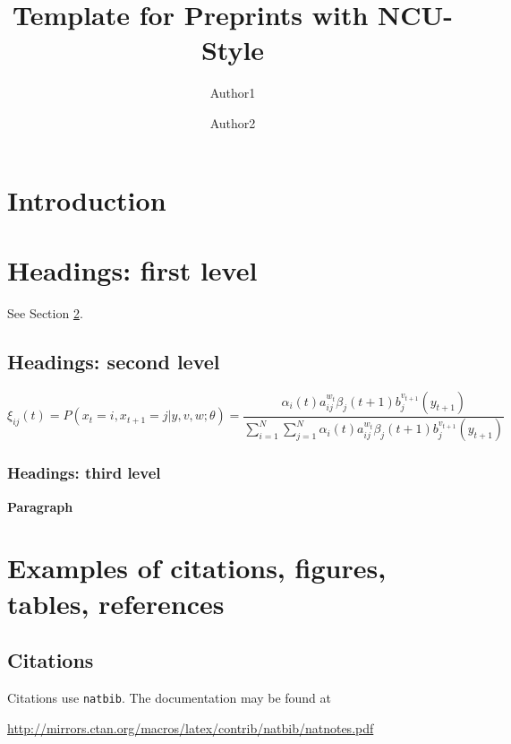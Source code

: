 \documentclass[]{ncu}
\title{Template for Preprints with NCU-Style}
\author[1]{Author1}
\author[2]{Author2}
\affiliation[1]{Affiliation}
\affiliation[2]{Affiliation}
\renewcommand{\paragraph}[1]{\vspace{1.25mm}\noindent\textbf{#1}}
\theoremstyle{plain}
\theoremstyle{definition}
\theoremstyle{remark}
\begin{document}
\maketitle


\section{Introduction}
\lipsum[2]
\lipsum[3]


\section{Headings: first level}
\label{sec:headings}

\lipsum[4] See Section \ref{sec:headings}.

\subsection{Headings: second level}
\lipsum[5]
\begin{equation}
	\xi _{ij}(t)=P(x_{t}=i,x_{t+1}=j|y,v,w;\theta)= {\frac {\alpha _{i}(t)a^{w_t}_{ij}\beta _{j}(t+1)b^{v_{t+1}}_{j}(y_{t+1})}{\sum _{i=1}^{N} \sum _{j=1}^{N} \alpha _{i}(t)a^{w_t}_{ij}\beta _{j}(t+1)b^{v_{t+1}}_{j}(y_{t+1})}}
\end{equation}

\subsubsection{Headings: third level}
\lipsum[6]

\paragraph{Paragraph}
\lipsum[7]



\section{Examples of citations, figures, tables, references}
\label{sec:others}

\subsection{Citations}
Citations use \verb+natbib+. The documentation may be found at
\begin{center}
	\url{http://mirrors.ctan.org/macros/latex/contrib/natbib/natnotes.pdf}
\end{center}
\end{document}
